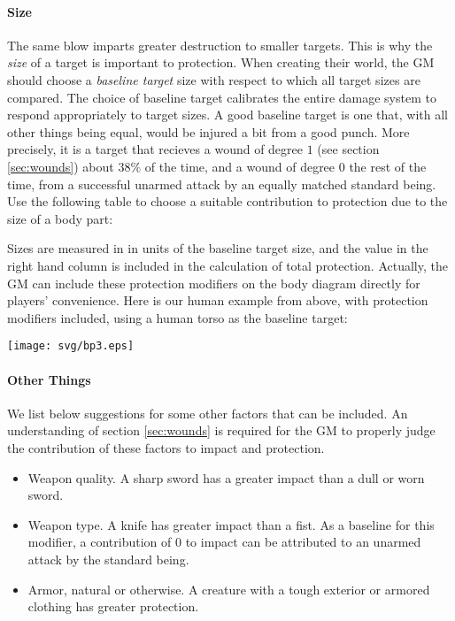 \documentclass[12pt]{article}
\newcommand{\emdex}[1]{\emph{#1}\index{#1}}
\begin{document}
\paragraph{Size}
The same blow imparts greater destruction to smaller targets. 
This is why the \emdex{size} of a target is important to protection.
When creating their world, the GM should choose a \emdex{baseline target}
size with respect to which all target sizes are compared.
The choice of baseline target calibrates the entire damage system to respond appropriately to target sizes.
A good baseline target is one that, with all other things being equal, would be injured a bit from a good punch.
More precisely, it is a target that recieves a wound of degree $1$ (see section \ref{sec:wounds}) about $38\%$
of the time, and a wound of degree $0$ the rest of the time, from a successful unarmed attack by an equally matched standard being.
Use the following table to choose a suitable contribution to protection due to the size of a body part:
\begin{center}

\end{center}
Sizes are measured in in units of the baseline target size,
and the value in the right hand column is included in the calculation of total protection.
Actually, the GM can include these protection modifiers on the body diagram
directly for players' convenience.
Here is our human example from above, with protection modifiers included,
using a human torso as the baseline target:

\begin{center} \texttt{[image: svg/bp3.eps]} \end{center}

\paragraph{Other Things}
We list below suggestions for some other factors that can be included.
An understanding of section \ref{sec:wounds} is required for the GM to properly
judge the contribution of these factors to impact and protection.
\vspace{-1em}\begin{itemize}
\item Weapon quality. A sharp sword has a greater impact than a dull or worn sword.
\item Weapon type. A knife has greater impact than a fist.
As a baseline for this modifier, a contribution of $0$ to impact
can be attributed to an unarmed attack by the standard being.
\item Armor, natural or otherwise. A creature with a tough exterior or armored clothing has greater protection.
\end{itemize}
\end{document}
